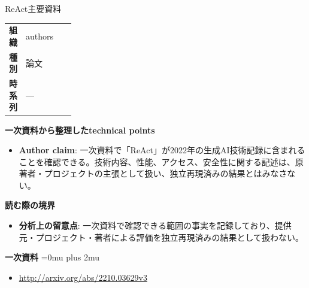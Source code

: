 \begin{technicalnote}{ReAct}{主要資料}
\begingroup
\begin{tabularx}{\linewidth}{@{}>{\bfseries}p{0.22\linewidth}X@{}}
組織 & authors \\
種別 & 論文 \\
時系列 & — \\
\end{tabularx}
\smallskip
{\bfseries 一次資料から整理したtechnical points}
\begin{itemize}[leftmargin=1.5em,itemsep=0.35em]
\item \textbf{Author claim}: 一次資料で「ReAct」が2022年の生成AI技術記録に含まれることを確認できる。技術内容、性能、アクセス、安全性に関する記述は、原著者・プロジェクトの主張として扱い、独立再現済みの結果とはみなさない。
\end{itemize}
\begin{minipage}{\linewidth}
{\bfseries 読む際の境界}
\begin{itemize}[leftmargin=1.5em,itemsep=0.35em]
\item \textbf{分析上の留意点}: 一次資料で確認できる範囲の事実を記録しており、提供元・プロジェクト・著者による評価を独立再現済みの結果として扱わない。
\end{itemize}
\begin{samepage}
{\bfseries 一次資料}
\begingroup\sloppy
\Urlmuskip=0mu plus 2mu\relax
\begin{itemize}[leftmargin=1.5em,itemsep=0.25em]
\item {\scriptsize\url{http://arxiv.org/abs/2210.03629v3}}
\end{itemize}
\endgroup
\end{samepage}
\end{minipage}
\endgroup
\end{technicalnote}
\medskip

